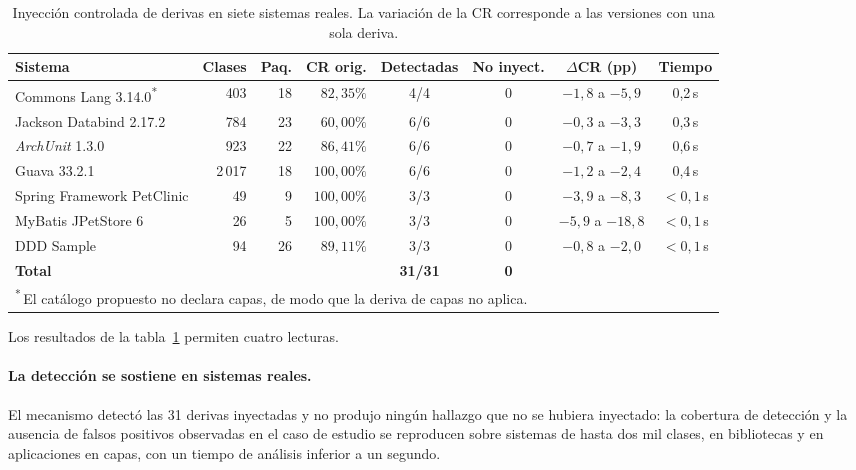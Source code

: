 \begin{table}[H]
\centering
\caption{Inyección controlada de derivas en siete sistemas reales. La variación de la CR corresponde a las versiones con una sola deriva.}
\label{tab:sistemas}
\footnotesize
\begin{tabularx}{\textwidth}{Xrrrcccc}
\toprule
\textbf{Sistema} & \textbf{Clases} & \textbf{Paq.} & \textbf{CR orig.} & \textbf{Detectadas} & \textbf{No inyect.} & \textbf{$\Delta$CR (pp)} & \textbf{Tiempo} \\
\midrule
Commons Lang 3.14.0\textsuperscript{*} & 403 & 18 & $82{,}35\%$ & 4/4 & 0 & $-1{,}8$ a $-5{,}9$ & 0,2\,s \\
Jackson Databind 2.17.2 & 784 & 23 & $60{,}00\%$ & 6/6 & 0 & $-0{,}3$ a $-3{,}3$ & 0,3\,s \\
\textit{ArchUnit} 1.3.0 & 923 & 22 & $86{,}41\%$ & 6/6 & 0 & $-0{,}7$ a $-1{,}9$ & 0,6\,s \\
Guava 33.2.1 & 2\,017 & 18 & $100{,}00\%$ & 6/6 & 0 & $-1{,}2$ a $-2{,}4$ & 0,4\,s \\
\midrule
Spring Framework PetClinic & 49 & 9 & $100{,}00\%$ & 3/3 & 0 & $-3{,}9$ a $-8{,}3$ & $<0{,}1$\,s \\
MyBatis JPetStore 6 & 26 & 5 & $100{,}00\%$ & 3/3 & 0 & $-5{,}9$ a $-18{,}8$ & $<0{,}1$\,s \\
DDD Sample & 94 & 26 & $89{,}11\%$ & 3/3 & 0 & $-0{,}8$ a $-2{,}0$ & $<0{,}1$\,s \\
\midrule
\textbf{Total} & & & & \textbf{31/31} & \textbf{0} & & \\
\bottomrule
\multicolumn{8}{l}{\textsuperscript{*}\,El catálogo propuesto no declara capas, de modo que la deriva de capas no aplica.}
\end{tabularx}
\end{table}

Los resultados de la tabla~\ref{tab:sistemas} permiten cuatro lecturas.

\paragraph{La detección se sostiene en sistemas reales.} El mecanismo detectó las 31 derivas inyectadas y no produjo ningún hallazgo que no se hubiera inyectado: la cobertura de detección y la ausencia de falsos positivos observadas en el caso de estudio se reproducen sobre sistemas de hasta dos mil clases, en bibliotecas y en aplicaciones en capas, con un tiempo de análisis inferior a un segundo.

